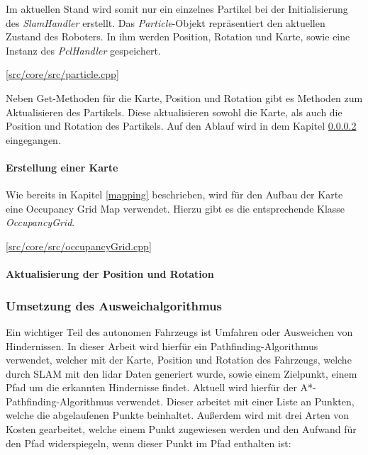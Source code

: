 Im aktuellen Stand wird somit nur ein einzelnes Partikel bei der Initialisierung des \textit{SlamHandler} erstellt.
Das \textit{Particle}-Objekt repräsentiert den aktuellen Zustand des Roboters.
In ihm werden Position, Rotation und Karte, sowie eine Instanz des \textit{PclHandler} gespeichert.

[\href{https://github.com/Jundy0/Studienarbeit/blob/main/src/core/src/particle.cpp}{src/core/src/particle.cpp}]

Neben Get-Methoden für die Karte, Position und Rotation gibt es Methoden zum Aktualisieren des Partikels.
Diese aktualisieren sowohl die Karte, als auch die Position und Rotation des Partikels.
Auf den Ablauf wird in dem Kapitel \ref{position_update} eingegangen.

\paragraph{Erstellung einer Karte}
Wie bereits in Kapitel \ref{mapping} beschrieben, wird für den Aufbau der Karte eine Occupancy Grid Map verwendet.
Hierzu gibt es die entsprechende Klasse \textit{OccupancyGrid}.

[\href{https://github.com/Jundy0/Studienarbeit/blob/main/src/core/src/occupancyGrid.cpp}{src/core/src/occupancyGrid.cpp}]



\paragraph{Aktualisierung der Position und Rotation}
\label{position_update}%



\subsubsection{Umsetzung des Ausweichalgorithmus}

Ein wichtiger Teil des autonomen Fahrzeugs ist Umfahren oder Ausweichen von Hindernissen. In dieser Arbeit wird hierfür ein Pathfinding-Algorithmus verwendet, welcher mit der Karte, Position und Rotation des Fahrzeugs, welche durch SLAM mit den \ac{lidar} Daten generiert wurde, sowie einem Zielpunkt, einem Pfad um die erkannten Hindernisse findet. Aktuell wird hierfür der A*-Pathfinding-Algorithmus verwendet. Dieser arbeitet mit einer Liste an Punkten, welche die abgelaufenen Punkte beinhaltet. Außerdem wird mit drei Arten von Kosten gearbeitet, welche einem Punkt zugewiesen werden und den Aufwand für den Pfad widerspiegeln, wenn dieser Punkt im Pfad enthalten ist:

